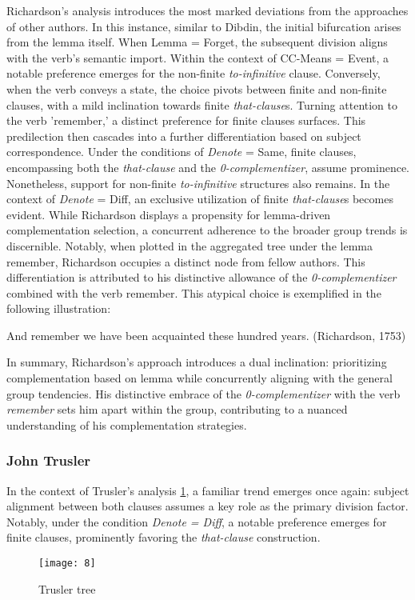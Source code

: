 \documentclass[final]{clv3} %
\begin{document}
Richardson’s analysis introduces the most marked deviations from the approaches of other authors. In this instance, similar to Dibdin, the initial bifurcation arises from the lemma itself. When Lemma = Forget, the subsequent division aligns with the verb’s semantic import. Within the context of CC-Means = Event, a notable preference emerges for the non-finite \textit{to-infinitive} clause. Conversely, when the verb conveys a state, the choice pivots between finite and non-finite clauses, with a mild inclination towards
finite \textit{that-clause}s.
Turning attention to the verb 'remember,' a distinct preference for finite clauses surfaces. This predilection then cascades into a further differentiation based on subject correspondence. Under the conditions of \textit{Denote} = Same, finite clauses, encompassing both the \textit{that-clause} and the \textit{0-complementizer}, assume prominence. Nonetheless, support for non-finite \textit{to-infinitive} structures also remains. In the context of \textit{Denote} = Diff, an exclusive utilization of finite \textit{that-clause}s becomes evident.
While Richardson displays a propensity for lemma-driven complementation selection, a concurrent adherence to the broader group trends is discernible. Notably, when plotted in the aggregated tree under the lemma remember, Richardson occupies a distinct node from fellow authors. This differentiation is attributed to his distinctive allowance of the \textit{0-complementizer} combined with the verb remember. This atypical choice is exemplified in the following illustration:

\begin{example}
And remember we have been acquainted these hundred years.    (Richardson, 1753)
\end{example}

In summary, Richardson's approach introduces a dual inclination: prioritizing complementation based on lemma while concurrently aligning with the general group tendencies. His distinctive embrace of the \textit{\textit{0-complementizer}} with the verb \textit{remember} sets him apart within the group, contributing to a nuanced understanding of his complementation strategies.

\subsubsection{John Trusler}

In the context of Trusler's analysis \cref{fig:10}, a familiar trend emerges once again: subject alignment between both clauses assumes a key role as the primary division factor. Notably, under the condition \textit{\textit{Denote} = Diff}, a notable preference emerges for finite clauses, prominently favoring the \textit{that-clause} construction.
\begin{figure}[htpb]
    \centering
    \texttt{[image: 8]}
    \caption{Trusler tree}
    \label{fig:10}
\end{figure}
\end{document}
